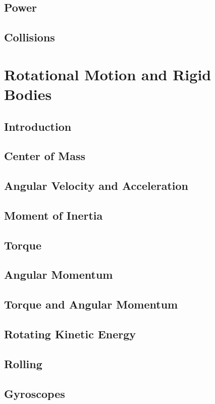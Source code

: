 \documentclass{report}
\begin{document}
\section{Power}
\section{Collisions}


\chapter{Rotational Motion and Rigid Bodies}
\section{Introduction}
\section{Center of Mass}
\section{Angular Velocity and Acceleration}
\section{Moment of Inertia}
\section{Torque}
\section{Angular Momentum}
\section{Torque and Angular Momentum}
\section{Rotating Kinetic Energy}
\section{Rolling}
\section{Gyroscopes}
\end{document}
